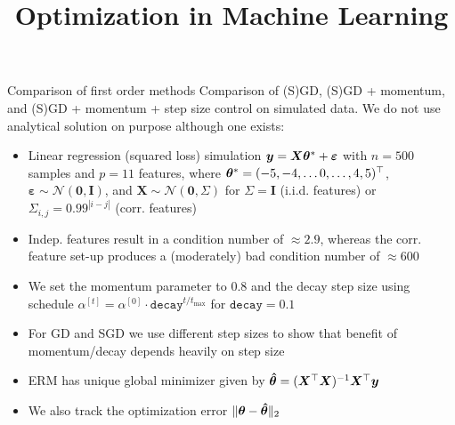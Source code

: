 \documentclass[11pt,compress,t,notes=noshow, xcolor=table]{beamer}
\title{Optimization in Machine Learning}
\begin{document}


\begin{vbframe}{Comparison of first order methods}
Comparison of (S)GD, (S)GD + momentum, and (S)GD + momentum + step size control on simulated data. We do not use analytical solution on purpose although one exists:
{\small
\begin{itemize}
    \item Linear regression (squared loss) simulation $\bm{y} = \bm{X}\bm{\theta}^{\ast} + \bm{\varepsilon}$ with $n=500$ samples and $p=11$ features, where $\bm{\theta}^{\ast}=(-5,-4,\ldots0,\ldots,4,5)^{\top}$, $\bm{\varepsilon} \sim \mathcal{N}(\bm{0}, \bm{I})$, and $\bm{X} \sim \mathcal{N}(\bm{0}, \Sigma)$ for $\Sigma=\bm{I}$ (i.i.d. features) or $\Sigma_{i,j}=0.99^{|i-j|}$ (corr. features)
    \item Indep. features result in a condition number of $\approx 2.9$, whereas the corr. feature set-up produces a (moderately) bad condition number of $\approx 600$
    \item We set the momentum parameter to $0.8$ and the decay step size using schedule $\alpha^{[t]}=\alpha^{[0]} \cdot \texttt{decay}^{t/t_{\text{max}}}$ for $\texttt{decay}=0.1$
    \item For GD and SGD we use different step sizes to show that benefit of momentum/decay depends heavily on step size
    \item ERM has unique global minimizer given by $\bm{\hat{\theta}} = (\bm{X}^{\top}\bm{X})^{-1}\bm{X}^{\top} \bm{y}$
    \item We also track the optimization error $\Vert \bm{\theta} - \bm{\hat{\theta}} \Vert_2$
\end{itemize}
}
\end{vbframe}

\end{document}
